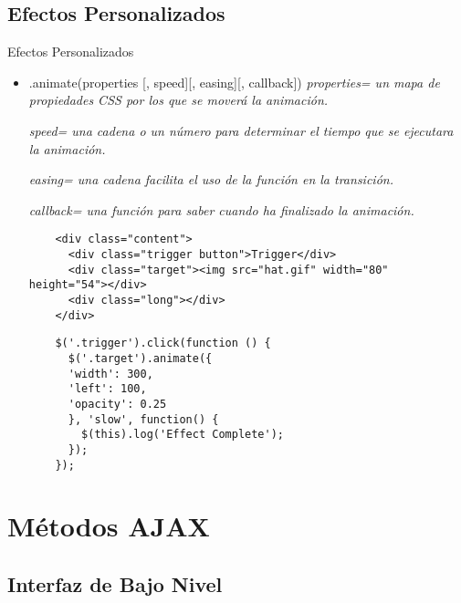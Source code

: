 \subsection{Efectos Personalizados} %

\begin{frame}[fragile]{Efectos Personalizados} %
\begin{itemize}
    \item .animate(properties [, speed][, easing][, callback])  \textit{
    properties= un mapa de propiedades CSS por los que se moverá la animación.}

    \textit{ speed= una cadena o un número para determinar el tiempo que se ejecutara la animación.}

    \textit{ easing= una cadena facilita el uso de la función en la transición.}

    \textit{ callback= una función para saber cuando ha finalizado la animación.}
    \begin{lstlisting}
    <div class="content">
      <div class="trigger button">Trigger</div>
      <div class="target"><img src="hat.gif" width="80" height="54"></div>
      <div class="long"></div>
    </div>
    \end{lstlisting}
    \begin{lstlisting}
    $('.trigger').click(function () {
      $('.target').animate({
      'width': 300, 
      'left': 100, 
      'opacity': 0.25
      }, 'slow', function() {
        $(this).log('Effect Complete');
      });  
    });
    \end{lstlisting}
\end{itemize}
\end{frame}

\section{Métodos AJAX} %

\subsection{Interfaz de Bajo Nivel} %

